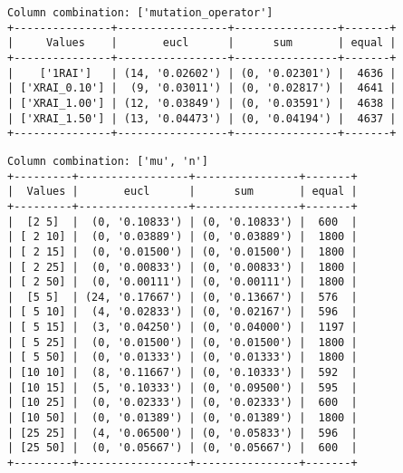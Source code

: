 \documentclass{article}
\begin{document}
\begin{verbatim}
Column combination: ['mutation_operator']
+---------------+-----------------+----------------+-------+
|     Values    |       eucl      |      sum       | equal |
+---------------+-----------------+----------------+-------+
|    ['1RAI']   | (14, '0.02602') | (0, '0.02301') |  4636 |
| ['XRAI_0.10'] |  (9, '0.03011') | (0, '0.02817') |  4641 |
| ['XRAI_1.00'] | (12, '0.03849') | (0, '0.03591') |  4638 |
| ['XRAI_1.50'] | (13, '0.04473') | (0, '0.04194') |  4637 |
+---------------+-----------------+----------------+-------+
\end{verbatim}

\begin{verbatim}
Column combination: ['mu', 'n']
+---------+-----------------+----------------+-------+
|  Values |       eucl      |      sum       | equal |
+---------+-----------------+----------------+-------+
|  [2 5]  |  (0, '0.10833') | (0, '0.10833') |  600  |
| [ 2 10] |  (0, '0.03889') | (0, '0.03889') |  1800 |
| [ 2 15] |  (0, '0.01500') | (0, '0.01500') |  1800 |
| [ 2 25] |  (0, '0.00833') | (0, '0.00833') |  1800 |
| [ 2 50] |  (0, '0.00111') | (0, '0.00111') |  1800 |
|  [5 5]  | (24, '0.17667') | (0, '0.13667') |  576  |
| [ 5 10] |  (4, '0.02833') | (0, '0.02167') |  596  |
| [ 5 15] |  (3, '0.04250') | (0, '0.04000') |  1197 |
| [ 5 25] |  (0, '0.01500') | (0, '0.01500') |  1800 |
| [ 5 50] |  (0, '0.01333') | (0, '0.01333') |  1800 |
| [10 10] |  (8, '0.11667') | (0, '0.10333') |  592  |
| [10 15] |  (5, '0.10333') | (0, '0.09500') |  595  |
| [10 25] |  (0, '0.02333') | (0, '0.02333') |  600  |
| [10 50] |  (0, '0.01389') | (0, '0.01389') |  1800 |
| [25 25] |  (4, '0.06500') | (0, '0.05833') |  596  |
| [25 50] |  (0, '0.05667') | (0, '0.05667') |  600  |
+---------+-----------------+----------------+-------+
\end{verbatim}
\end{document}
